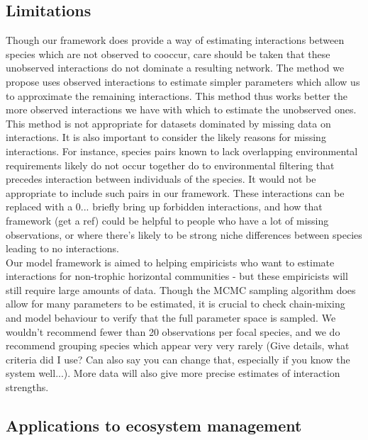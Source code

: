 \documentclass[a4,12pt]{article}
\begin{document}

    \subsection{Limitations}
        
        Though our framework does provide a way of estimating interactions between species which are not observed to cooccur, care should be taken that these unobserved interactions do not dominate a resulting network. The method we propose uses observed interactions to estimate simpler parameters which allow us to approximate the remaining interactions. This method thus works better the more observed interactions we have with which to estimate the unobserved ones. This method is not appropriate for datasets dominated by missing data on interactions.  It is also important to consider the likely reasons for missing interactions.  For instance, species pairs known to lack overlapping environmental requirements likely do not occur together do to environmental filtering that precedes interaction between individuals of the species.  It would not be appropriate to include such pairs in our framework. These interactions can be replaced with a 0... briefly bring up forbidden interactions, and how that framework (get a ref) could be helpful to people who have a lot of missing observations, or where there’s likely to be strong niche differences between species leading to no interactions. \\

        Our model framework is aimed to helping empiricists who want to estimate interactions for non-trophic horizontal communities - but these empiricists will still require large amounts of data. Though the MCMC sampling algorithm does allow for many parameters to be estimated, it is crucial to check chain-mixing and model behaviour to verify that the full parameter space is sampled. We wouldn't recommend fewer than 20 observations per focal species, and we do recommend grouping species which appear very very rarely (Give details, what criteria did I use? Can also say you can change that, especially if you know the system well...). More data will also give more precise estimates of interaction strengths.   


    \subsection{Applications to ecosystem management}
\end{document}
